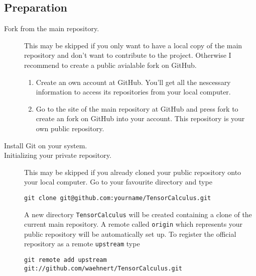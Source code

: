 \documentclass[a4paper,10pt]{scrartcl}
\begin{document}
\subsection*{Preparation}
\begin{description}
  \item[Fork from the main repository.] This may be skipped if you only want to have a local copy of the main repository and don't want to contribute to the project. Otherwise I recommend to create a public avialable fork on GitHub.
    \begin{enumerate}
      \item Create an own account at GitHub. You'll get all the nescessary information to access its repositories from your local computer.
      \item Go to the site of the main repository at GitHub and press fork to create an fork on GitHub into your account. This repository is your own public repository.
    \end{enumerate}
  \item[Install Git on your system.] 
  \item[Initializing your private repository.] This may be skipped if you already cloned your public repository onto your local computer. 
    Go to your favourite directory and type 
\begin{lstlisting}
git clone git@github.com:yourname/TensorCalculus.git
\end{lstlisting}
    A new directory \texttt{TensorCalculus} will be created containing a clone of the current main repository. A remote called \texttt{origin} which represents your public repository will be automatically set up. To register the official repository as a remote \texttt{upstream} type
\begin{lstlisting}
git remote add upstream git://github.com/waehnert/TensorCalculus.git
\end{lstlisting}
\end{description}
\end{document}
